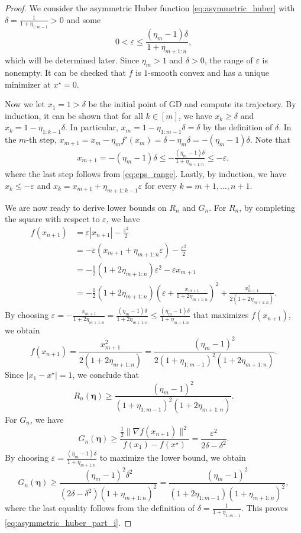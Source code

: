 \documentclass[11pt]{article}
\newcommand{\abs}[1]{\left\lvert#1\right\rvert}
\newcommand{\norm}[1]{\lVert#1\rVert}
\newcommand{\schedule}{\bm{\eta}}
\begin{document}
\begin{proof}
We consider the asymmetric Huber function \eqref{eq:asymmetric_huber} with $\delta= \frac{ 1 }{ 1+\eta_{1:m-1} } > 0$ and some
\begin{equation}\label{eq:eps_range}
	0< \varepsilon \leq \frac{  (\eta_m-1)\delta }{ 1 + \eta_{m+1:n} },
\end{equation}
which will be determined later.
Since $\eta_m>1$ and $\delta>0$, the range of $\varepsilon$ is nonempty.
It can be checked that $f$ is $1$-smooth convex and has a unique minimizer at $x^\star=0$.

Now we let $x_1 = 1 > \delta$ be the initial point of GD and compute its trajectory.
By induction, it can be shown that for all $k\in[m]$, we have $x_k\geq\delta$ and $x_k = 1 - \eta_{1:k-1}\delta$.
In particular, $x_m = 1 - \eta_{1:m-1}\delta = \delta$ by the definition of $\delta$.
In the $m$-th step, $x_{m+1} = x_m - \eta_m f'(x_m) = \delta - \eta_m\delta = -(\eta_m-1)\delta$.
Note that
\begin{align*}
	x_{m+1} = -(\eta_m-1)\delta \leq -\frac{  (\eta_m-1)\delta }{ 1 + \eta_{m+1:n} } \leq -\varepsilon,
\end{align*}
where the last step follows from \eqref{eq:eps_range}.
Lastly, by induction, we have $x_k\leq-\varepsilon$ and $x_{k} = x_{m+1} + \eta_{m+1:k-1}\varepsilon$ for every $k=m+1,\ldots,n+1$.


We are now ready to derive lower bounds on $R_n$ and $G_n$.
For $R_n$, by completing the square with respect to $\varepsilon$, we have
\begin{align*}
	f(x_{n+1})
	&= \varepsilon\abs{ x_{n+1} } - \frac{ \varepsilon^2 }{2}  \\
	&= -\varepsilon( x_{m+1} + \eta_{m+1:n}\varepsilon ) - \frac{ \varepsilon^2 }{2} \\
	&= - \frac{1}{2} \left( 1 + 2\eta_{m+1:n} \right) \varepsilon^2 - \varepsilon x_{m+1} \\
	&= - \frac{1}{2} \left( 1 + 2\eta_{m+1:n} \right) \left( \varepsilon + \frac{x_{m+1}}{1+2\eta_{m+1:n}} \right)^2 + \frac{ x_{m+1}^2 }{ 2 ( 1+2\eta_{m+1:n} ) }.
\end{align*}
By choosing $\varepsilon = -\frac{ x_{m+1} }{ 1 + 2\eta_{m+1:n} } = \frac{  (\eta_m-1)\delta }{ 1 + 2\eta_{m+1:n} } \leq \frac{  (\eta_m-1)\delta }{ 1 + \eta_{m+1:n} }$ that maximizes $f(x_{n+1})$, we obtain
\[
	f(x_{n+1}) = \frac{ x_{m+1}^2 }{ 2 ( 1+2\eta_{m+1:n} ) }
	= \frac{ (\eta_m-1)^2 }{ 2 (1 + \eta_{1:m-1})^2( 1+2\eta_{m+1:n} ) }.
\]
Since $\abs{x_1-x^\star}=1$, we conclude that
\[
	R_n(\schedule) \geq \frac{ (\eta_m-1)^2 }{ (1 + \eta_{1:m-1})^2( 1+2\eta_{m+1:n} ) }.
\]
For $G_n$, we have
\[
	G_n(\schedule)
	\geq \frac{ \frac{1}{2}\norm{ \nabla f(x_{n+1}) }^2 }{ f(x_1) - f(x^\star) }
	= \frac{ \varepsilon^2 }{ 2\delta - \delta^2 }.
\]
By choosing $\varepsilon = \frac{  (\eta_m-1)\delta }{ 1 + \eta_{m+1:n} }$ to maximize the lower bound, we obtain
\[
	G_n(\schedule)
	\geq \frac{ (\eta_m-1)^2\delta^2 }{ (2\delta-\delta^2)(1+\eta_{m+1:n})^2 }
	= \frac{ (\eta_m-1)^2 }{ (1 + 2\eta_{1:m-1})(1+\eta_{m+1:n})^2 },
\]
where the last equality follows from the definition of $\delta=\frac{1}{1+\eta_{1:m-1}}$.
This proves \eqref{eq:asymmetric_huber_part_i}.


\end{proof}
\end{document}
